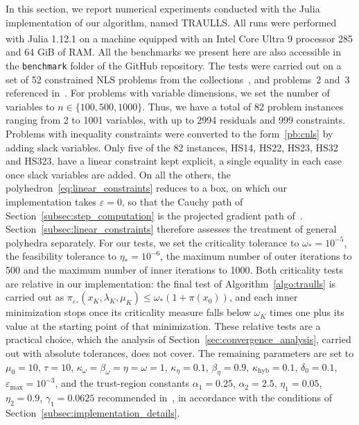 \documentclass[pdflatex,sn-mathphys-num]{sn-jnl}%
\theoremstyle{thmstyleone}%
\begin{document}
In this section, we report numerical experiments conducted with the Julia implementation of our algorithm, named TRAULLS. All runs were performed with Julia 1.12.1 on a machine equipped with an Intel\textsuperscript{\textregistered} Core\textsuperscript{\texttrademark} Ultra 9 processor 285 and 64 GiB of RAM. All the benchmarks we present here are also accessible in the \texttt{benchmark} folder of the GitHub repository.
The tests were carried out on a set of 52 constrained NLS problems from the collections~\cite{hockschittkowski:1980, schittkowski:1987, lucksanvlcek:1999}, and problems~2 and~3 referenced in~\cite{biegler-etal2000}. For problems with variable dimensions, we set the number of variables to $n \in \{100, 500, 1000\}$. Thus, we have a total of 82 problem instances ranging from 2 to 1001 variables, with up to 2994 residuals and 999 constraints. Problems with inequality constraints were converted to the form~\eqref{pb:cnls} by adding slack variables. Only five of the 82 instances, HS14, HS22, HS23, HS32 and HS323, have a linear constraint kept explicit, a single equality in each case once slack variables are added. On all the others, the polyhedron~\eqref{eq:linear_constraints} reduces to a box, on which our implementation takes $\varepsilon = 0$, so that the Cauchy path of Section~\ref{subsec:step_computation} is the projected gradient path of~\cite{conn-etal:1988b}. Section~\ref{subsec:linear_constraints} therefore assesses the treatment of general polyhedra separately. For our tests, we set the criticality tolerance to $\omega_* = 10^{-5}$, the feasibility tolerance to $\eta_* = 10^{-6}$, the maximum number of outer iterations to 500 and the maximum number of inner iterations to 1000. Both criticality tests are relative in our implementation: the final test of Algorithm~\ref{algo:traulls} is carried out as $\pi_{\varepsilon_*}(x_K,\lambda_K,\mu_K) \le \omega_*(1+\pi(x_0))$, and each inner minimization stops once its criticality measure falls below $\omega_K$ times one plus its value at the starting point of that minimization. These relative tests are a practical choice, which the analysis of Section~\ref{sec:convergence_analysis}, carried out with absolute tolerances, does not cover. The remaining parameters are set to $\mu_0 = 10$, $\tau = 10$, $\kappa_\omega = \beta_\omega = \eta = \omega = 1$, $\kappa_\eta = 0.1$, $\beta_\eta = 0.9$, $\kappa_{\mathrm{hyb}} = 0.1$, $\delta_0 = 0.1$, $\varepsilon_{\max} = 10^{-3}$, and the trust-region constants $\alpha_1 = 0.25$, $\alpha_2 = 2.5$, $\eta_1 = 0.05$, $\eta_2 = 0.9$, $\gamma_1 = 0.0625$ recommended in~\cite[Section~17.1]{conn-etal:2000}, in accordance with the conditions of Section~\ref{subsec:implementation_details}.
\end{document}
